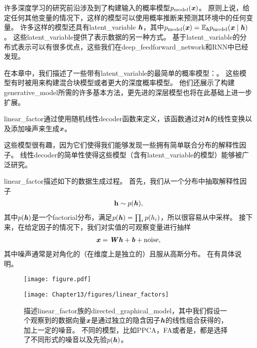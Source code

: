 \chapter{}
\label{chap:linear_factor_models}




许多深度学习的研究前沿涉及到了构建输入的概率模型$p_{\text{model}}(\boldsymbol{\mathit{x}})$。
原则上说，给定任何其他变量的情况下，这样的模型可以使用概率推断来预测其环境中的任何变量。
许多这样的模型还具有\gls{latent_variable} $\boldsymbol{\mathit{h}}$，其中$p_{\text{model}}(\boldsymbol{\mathit{x}}) = \mathbb{E}_{\boldsymbol{\mathit{h}}} p_{\text{model}}(\boldsymbol{\mathit{x}}\mid\boldsymbol{\mathit{h}})$。
这些\gls{latent_variable}提供了表示数据的另一种方式。
 基于\gls{latent_variable}的分布式表示可以有很多优点，这些我们在\gls{deep_feedforward_network}和\gls{RNN}中已经发现。


在本章中，我们描述了一些带有\gls{latent_variable}的最简单的概率模型：。
这些模型有时被用来构建混合块模型\citep{Hinton-nips95,ghahramani96em,Roweis+Saul+Hinton-2002}或者更大的深度概率模型\citep{tang2012deep}。
他们还展示了构建\gls{generative_model}所需的许多基本方法，更先进的深层模型也将在此基础上进一步扩展。


\gls{linear_factor}通过使用随机线性\gls{decoder}函数来定义，该函数通过对$\boldsymbol{\mathit{h}}$的线性变换以及添加噪声来生成$\boldsymbol{\mathit{x}}$。


这些模型很有趣，因为它们使得我们能够发现一些拥有简单联合分布的解释性因子。 
线性\gls{decoder}的简单性使得这些模型（含有\gls{latent_variable}的模型）能够被广泛研究。


\gls{linear_factor}描述如下的数据生成过程。 
首先，我们从一个分布中抽取解释性因子
\begin{align}
\label{eqn:131}
\mathbf{h} \sim p(\boldsymbol{\mathit{h}}),
\end{align}
其中$p(\boldsymbol{\mathit{h}})$是一个\gls{factorial}分布，满足$p(\boldsymbol{\mathit{h}}) = \prod_{i}^{}p(h_i)$，所以很容易从中采样。
接下来，在给定因子的情况下，我们对实值的可观察变量进行抽样
\begin{align}
\label{eqn:132}
\boldsymbol{\mathit{x}} = \boldsymbol{\mathit{W}} \boldsymbol{\mathit{h}} + \boldsymbol{\mathit{b}} + \text{noise},
\end{align}
其中噪声通常是对角化的（在维度上是独立的）且服从高斯分布。
在有具体说明。

\begin{figure}[!htb]
\ifOpenSource
\centerline{\texttt{[image: figure.pdf]}}
\else
	\centerline{\texttt{[image: Chapter13/figures/linear\_factors]}}
\fi
	\caption{描述\gls{linear_factor}族的\gls{directed_graphical_model}，其中我们假设一个观察到的数据向量$\boldsymbol{\mathit{x}}$是通过独立的隐含因子$\boldsymbol{\mathit{h}}$的线性组合获得的，加上一定的噪音。
		不同的模型，比如\gls{PPCA}，\gls{FA}或者是，都是选择了不同形式的噪音以及先验$p(\boldsymbol{\mathit{h}})$。}
	\label{fig:linear_factors}
\end{figure}


